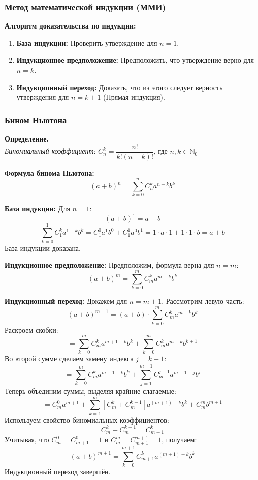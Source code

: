 \subsubsection{Метод математической индукции (ММИ)}
\begin{tcolorbox}
\textbf{Алгоритм доказательства по индукции:}
\begin{enumerate}
    \item \textbf{База индукции:} Проверить утверждение для $n = 1$.
    \item \textbf{Индукционное предположение:} Предположить, что утверждение верно для $n = k$.
    \item \textbf{Индукционный переход:} Доказать, что из этого следует верность утверждения для $n = k+1$ (Прямая индукция).
\end{enumerate}
\end{tcolorbox}

\subsubsection{Бином Ньютона}
\begin{tcolorbox}
\textbf{Определение.}\\
\textit{Биномиальный коэффициент}:
$C_n^k = \dfrac{n!}{k!(n-k)!}$, где $n,k \in \mathbb{N}_0$\\
\end{tcolorbox}

\begin{tcolorbox}
\textbf{Формула бинома Ньютона:}
$$(a+b)^n = \sum_{k=0}^{n} C_n^k a^{n-k}b^k$$
\end{tcolorbox}

\begin{tcolorbox}[title=Доказательство по ММИ, breakable]
\textbf{База индукции:} Для $n=1$:
$$(a+b)^1 = a + b$$
$$\sum_{k=0}^{1} C_1^k a^{1-k}b^k = C_1^0 a^1 b^0 + C_1^1 a^0 b^1 = 1 \cdot a \cdot 1 + 1 \cdot 1 \cdot b = a + b$$
База индукции доказана.

\textbf{Индукционное предположение:} Предположим, формула верна для $n = m$:
$$(a+b)^m = \sum_{k=0}^{m} C_m^k a^{m-k}b^k$$

\textbf{Индукционный переход:} Докажем для $n = m+1$.
Рассмотрим левую часть:
$$(a+b)^{m+1} = (a+b) \cdot \sum_{k=0}^{m} C_m^k a^{m-k}b^k$$
Раскроем скобки:
$$= \sum_{k=0}^{m} C_m^k a^{m+1-k}b^k + \sum_{k=0}^{m} C_m^k a^{m-k}b^{k+1}$$
Во второй сумме сделаем замену индекса $j = k+1$:
$$= \sum_{k=0}^{m} C_m^k a^{m+1-k}b^k + \sum_{j=1}^{m+1} C_m^{j-1} a^{m+1-j}b^{j}$$
Теперь объединим суммы, выделяя крайние слагаемые:
$$= C_m^0 a^{m+1} + \sum_{k=1}^{m} \left[ C_m^k + C_m^{k-1} \right] a^{(m+1)-k}b^k + C_m^m b^{m+1}$$
Используем свойство биномиальных коэффициентов:
$$C_m^k + C_m^{k-1} = C_{m+1}^k$$
Учитывая, что $C_m^0 = C_{m+1}^0 = 1$ и $C_m^m = C_{m+1}^{m+1} = 1$, получаем:
$$(a+b)^{m+1} = \sum_{k=0}^{m+1} C_{m+1}^k a^{(m+1)-k}b^k$$
Индукционный переход завершён.
\end{tcolorbox}

